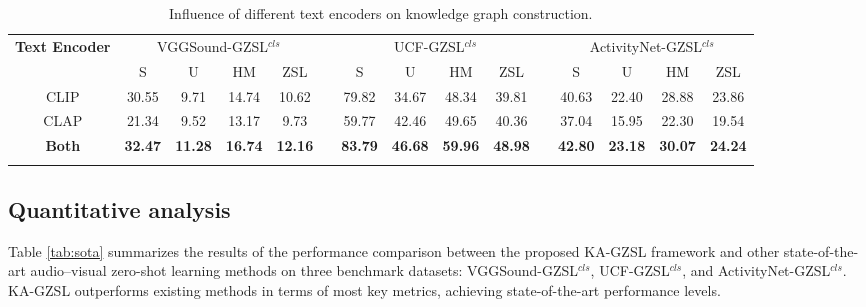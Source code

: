 \documentclass[lettersize,journal]{IEEEtran}
\begin{document}
\begin{table}[!t]
  \centering
  \caption{Influence of different text encoders on knowledge graph construction.}
  \label{tab:text_encoder}
  \begin{tabular}{c cccc c cccc c cccc}
    \toprule[2pt]
    \multirow{2}{*}{\textbf{Text Encoder}} 
    & \multicolumn{4}{c}{VGGSound-GZSL$^{\textit{cls}}$} & & \multicolumn{4}{c}{UCF-GZSL$^{\textit{cls}}$} & & \multicolumn{4}{c}{ActivityNet-GZSL$^{\textit{cls}}$} \\
    \cmidrule(lr){2-5} \cmidrule(lr){7-10} \cmidrule(lr){12-15}
    & S & U & HM & ZSL & & S & U & HM & ZSL & & S & U & HM & ZSL \\
    \midrule[1pt]
    CLIP & 30.55 & 9.71 & 14.74 & 10.62 & & 79.82 & 34.67 & 48.34 & 39.81 & & 40.63 & 22.40 & 28.88 & 23.86 \\
    CLAP & 21.34 & 9.52 & 13.17 & 9.73 & & 59.77 & 42.46 & 49.65 & 40.36 & & 37.04 & 15.95 & 22.30 & 19.54 \\
    
    \noalign{\global\setlength{\oldaboverulesep}{\aboverulesep}}
    \noalign{\global\setlength{\oldbelowrulesep}{\belowrulesep}}
    \noalign{\global\setlength{\aboverulesep}{0pt}}
    \noalign{\global\setlength{\belowrulesep}{1.5pt}}
    \midrule[1pt]
    \rowcolor{gray!25}
    \textbf{Both} & \textbf{32.47} & \textbf{11.28} & \textbf{16.74} & \textbf{12.16} & & \textbf{83.79} & \textbf{46.68} & \textbf{59.96} & \textbf{48.98} & & \textbf{42.80} & \textbf{23.18} & \textbf{30.07} & \textbf{24.24} \\
    \bottomrule[2pt]
    \noalign{\global\setlength{\aboverulesep}{\oldaboverulesep}}
    \noalign{\global\setlength{\belowrulesep}{\oldbelowrulesep}}
  \end{tabular}
\end{table}


\subsection{Quantitative analysis}
Table \ref{tab:sota} summarizes the results of the performance comparison between the proposed KA-GZSL framework and other state-of-the-art audio–visual zero-shot learning methods on three benchmark datasets: VGGSound-GZSL$^{\textit{cls}}$, UCF-GZSL$^{\textit{cls}}$, and ActivityNet-GZSL$^{\textit{cls}}$. KA-GZSL outperforms existing methods in terms of most key metrics, achieving state-of-the-art performance levels.
\end{document}
